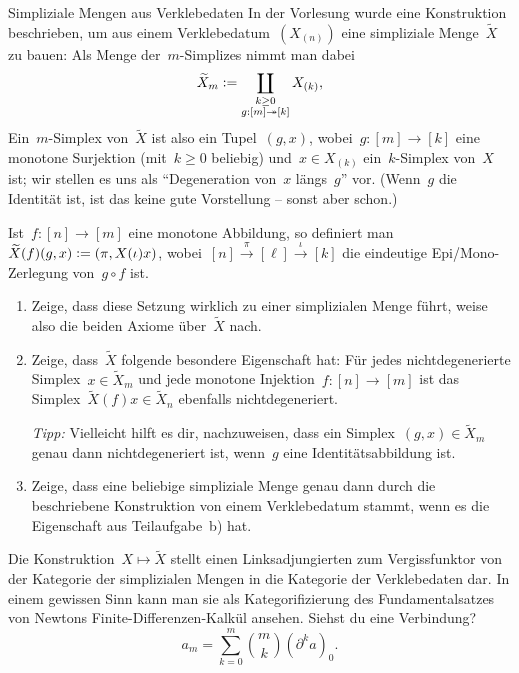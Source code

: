 \documentclass{uebblatt}
\begin{document}
\begin{aufgabe}{Simpliziale Mengen aus Verklebedaten}
In der Vorlesung wurde eine Konstruktion beschrieben, um aus einem
Verklebedatum~$(X_{(n)})$ eine simpliziale Menge~$\widetilde X$ zu bauen: Als
Menge der~$m$-Simplizes nimmt man dabei
\[ \widetilde X_m \vcentcolon= \coprod_{\substack{k \geq 0 \\ g : [m] \twoheadrightarrow [k]}} X_{(k)}, \]
Ein~$m$-Simplex von~$\widetilde X$ ist also ein Tupel~$(g,x)$, wobei~$g : [m]
\to [k]$ eine monotone Surjektion (mit~$k \geq 0$ beliebig) und~$x \in X_{(k)}$
ein~$k$-Simplex von~$X$ ist; wir stellen es uns als "`Degeneration von~$x$
längs~$g$"' vor. (Wenn~$g$ die Identität ist, ist das keine gute Vorstellung --
sonst aber schon.)

Ist~$f : [n] \to [m]$ eine monotone Abbildung, so definiert
man~$\widetilde X(f)(g,x) \vcentcolon= (\pi, X(\iota)x)$, wobei~$[n]
\xrightarrow{\pi} [\ell] \xrightarrow{\iota} [k]$ die eindeutige Epi/Mono-Zerlegung
von~$g \circ f$ ist.
\begin{enumerate}
\item Zeige, dass diese Setzung wirklich zu einer simplizialen Menge führt,
weise also die beiden Axiome über~$\widetilde X$ nach.
\item Zeige, dass~$\widetilde X$ folgende besondere Eigenschaft hat: Für jedes
nichtdegenerierte Simplex~$x \in \widetilde X_m$ und jede monotone Injektion~$f
: [n] \to [m]$ ist das Simplex~$\widetilde X(f)x \in \widetilde X_n$
ebenfalls nichtdegeneriert.

\emph{Tipp:} Vielleicht hilft es dir, nachzuweisen, dass ein Simplex~$(g,x) \in
\widetilde X_m$ genau dann nichtdegeneriert ist, wenn~$g$ eine
Identitätsabbildung ist.

\item Zeige, dass eine beliebige simpliziale Menge genau dann durch die
beschriebene Konstruktion von einem Verklebedatum stammt, wenn es die
Eigenschaft aus Teilaufgabe~b) hat.
\end{enumerate}

Die Konstruktion~$X \mapsto \widetilde X$ stellt einen Linksadjungierten zum
Vergissfunktor von der Kategorie der simplizialen Mengen in die Kategorie der
Verklebedaten dar. In einem gewissen Sinn kann man sie als Kategorifizierung
des Fundamentalsatzes von Newtons Finite-Differenzen-Kalkül ansehen.
Siehst du eine Verbindung?
\[ a_m = \sum_{k=0}^m \binom{m}{k} (\partial^k a)_0. \]
\end{aufgabe}

\newpage
\end{document}
